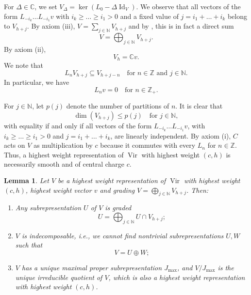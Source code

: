 \documentclass[a4paper, 12pt, reqno]{amsart}
\newtheorem{lemma}[theorem]{Lemma}
\theoremstyle{remark}
\numberwithin{equation}{subsection}
\DeclareMathOperator{\Vir}{Vir}
\DeclareMathOperator{\Id}{Id}
\begin{document}
For $\Delta \in \mathbb{C}$, we set $V_{\Delta} = \ker(L_0 - \Delta\Id_V)$.
We observe that all vectors of the form $L_{-i_k}\dots L_{-i_1}v$ with $i_k \ge \dots \ge i_1 > 0$ and a fixed value of $j = i_1 + \dots + i_k$ belong to $V_{h + j}$.
By axiom (iii), $V = \sum_{j \in \mathbb{N}}V_{h + j}$ and by , this is in fact a direct sum
\begin{equation}
  \label{eq:27}
  V = \bigoplus_{j \in \mathbb{N}}V_{h + j}.
\end{equation}
By axiom (ii),
\begin{equation*}
  V_h = \mathbb{C}v.
\end{equation*}
We note that
\begin{equation*}
  L_nV_{h + j}\subseteq V_{h + j - n} \quad \text{for }n \in \mathbb{Z}\text{ and }j \in \mathbb{N}.
\end{equation*}
In particular, we have
\begin{equation}
  \label{eq:28}
  L_nv = 0 \quad \text{for }n \in \mathbb{Z}_+.
\end{equation}

For $j \in \mathbb{N}$, let $p(j)$ denote the number of partitions of $n$.
It is clear that
\begin{equation}
  \label{eq:29}
  \dim(V_{h + j}) \le p(j) \quad \text{for }j \in \mathbb{N},
\end{equation}
with equality if and only if all vectors of the form $L_{-i_k}\dots L_{-i_1}v$, with $i_k \ge \dots \ge i_1 > 0$ and $j = i_1 + \dots + i_k$, are linearly independent.
By axiom (i), $C$ acts on $V$ as multiplication by $c$ because it commutes with every $L_n$ for $n \in \mathbb{Z}$.
Thus, a highest weight representation of $\Vir$ with highest weight $(c, h)$ is necessarily smooth and of central charge $c$.

\begin{lemma}
  \label{lmm:17}
  Let $V$ be a highest weight representation of $\Vir$ with highest weight $(c, h)$, highest weight vector $v$ and grading $V = \bigoplus_{j \in \mathbb{N}}V_{h + j}$.
  Then:
  \begin{enumerate}
  \item Any subrepresentation $U$ of $V$ is graded
    \begin{equation*}
      U = \bigoplus_{j \in \mathbb{N}}U \cap V_{h + j};
    \end{equation*}
  \item $V$ is indecomposable, i.e., we cannot find nontrivial subrepresentations $U, W$ such that
    \begin{equation*}
      V = U \oplus W;
    \end{equation*}
  \item $V$ has a unique maximal proper subrepresentation $J_{\max}$, and $V/J_{\max}$ is the unique irreducible quotient of $V$, which is also a highest weight representation with highest weight $(c, h)$.
  \end{enumerate}
\end{lemma}
\end{document}
